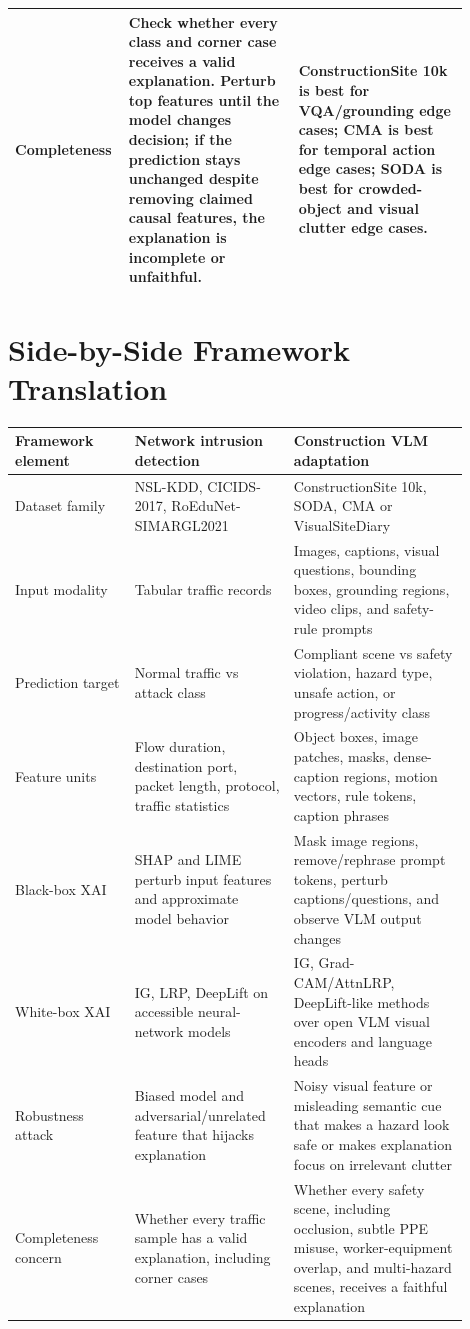 \documentclass[10pt]{article}
\begin{document}
\begin{longtable}{L{0.18\linewidth} L{0.36\linewidth} L{0.36\linewidth}}
\midrule
Completeness & Check whether every class and corner case receives a valid explanation. Perturb top features until the model changes decision; if the prediction stays unchanged despite removing claimed causal features, the explanation is incomplete or unfaithful. & ConstructionSite 10k is best for VQA/grounding edge cases; CMA is best for temporal action edge cases; SODA is best for crowded-object and visual clutter edge cases. \\
\bottomrule
\end{longtable}

\section{Side-by-Side Framework Translation}
\begin{longtable}{L{0.24\linewidth} L{0.31\linewidth} L{0.35\linewidth}}
\toprule
\textbf{Framework element} & \textbf{Network intrusion detection} & \textbf{Construction VLM adaptation} \\
\midrule
\endhead
Dataset family & NSL-KDD, CICIDS-2017, RoEduNet-SIMARGL2021 & ConstructionSite 10k, SODA, CMA or VisualSiteDiary \\
\midrule
Input modality & Tabular traffic records & Images, captions, visual questions, bounding boxes, grounding regions, video clips, and safety-rule prompts \\
\midrule
Prediction target & Normal traffic vs attack class & Compliant scene vs safety violation, hazard type, unsafe action, or progress/activity class \\
\midrule
Feature units & Flow duration, destination port, packet length, protocol, traffic statistics & Object boxes, image patches, masks, dense-caption regions, motion vectors, rule tokens, caption phrases \\
\midrule
Black-box XAI & SHAP and LIME perturb input features and approximate model behavior & Mask image regions, remove/rephrase prompt tokens, perturb captions/questions, and observe VLM output changes \\
\midrule
White-box XAI & IG, LRP, DeepLift on accessible neural-network models & IG, Grad-CAM/AttnLRP, DeepLift-like methods over open VLM visual encoders and language heads \\
\midrule
Robustness attack & Biased model and adversarial/unrelated feature that hijacks explanation & Noisy visual feature or misleading semantic cue that makes a hazard look safe or makes explanation focus on irrelevant clutter \\
\midrule
Completeness concern & Whether every traffic sample has a valid explanation, including corner cases & Whether every safety scene, including occlusion, subtle PPE misuse, worker-equipment overlap, and multi-hazard scenes, receives a faithful explanation \\
\bottomrule
\end{longtable}
\end{document}
